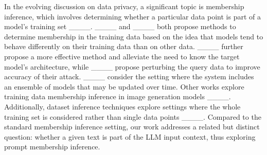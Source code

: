 In the evolving discussion on data privacy, a significant topic is membership inference, which involves determining whether a particular data point is part of a model's training set ____. 
____ and ____ both propose methods to determine membership in the training data based on the idea that models tend to behave differently on their training data than on other data. ____ further propose a more effective method and alleviate the need to know the target model's architecture, while ____ propose perturbing the query data to improve accuracy of their attack. 
____ consider the setting where the system includes an ensemble of models that may be updated over time. Other works explore training data membership inference in image generation models ____. Additionally, dataset inference techniques explore settings where the whole training set is considered rather than single data points ____.
Compared to the standard membership inference setting, our work addresses a related but distinct question: whether a given text is part of the LLM input context, thus exploring prompt membership inference. 
